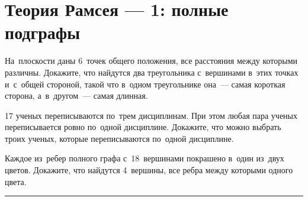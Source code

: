 
\section*{Теория Рамсея — 1: полные подграфы}


\begin{problems}

На~плоскости даны 6~точек общего положения, все расстояния между которыми
различны.
Докажите, что найдутся два треугольника с~вершинами в~этих точках и~с~общей
стороной, такой что в~одном треугольнике она~— самая короткая сторона,
а~в~другом~— самая длинная.

17 ученых переписываются по~трем дисциплинам.
При этом любая пара ученых переписывается ровно по~одной дисциплине.
Докажите, что можно выбрать троих ученых, которые переписываются по~одной
дисциплине.


Каждое из~ребер полного графа с~18~вершинами покрашено в~один из~двух цветов.
Докажите, что найдутся 4~вершины, все ребра между которыми одного цвета.

\end{problems}

\medskip
\hrule

